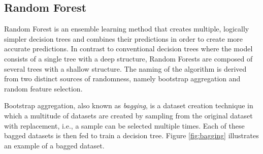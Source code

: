 


\subsection{Random Forest}

Random Forest is an ensemble learning method that creates multiple, logically simpler decision trees and combines their predictions in order to create more accurate predictions. In contrast to conventional decision trees where the model consists of a single tree with a deep structure, Random Forests are composed of several trees with a shallow structure. The naming of the algorithm is derived from two distinct sources of randomness, namely bootstrap aggregation and random feature selection.

Bootstrap aggregation, also known as \emph{bagging}, is a dataset creation technique in which a multitude of datasets are created by sampling from the original dataset with replacement, i.e., a sample can be selected multiple times. Each of these bagged datasets is then fed to train a decision tree. Figure \ref{fig:bagging} illustrates an example of a bagged dataset.


